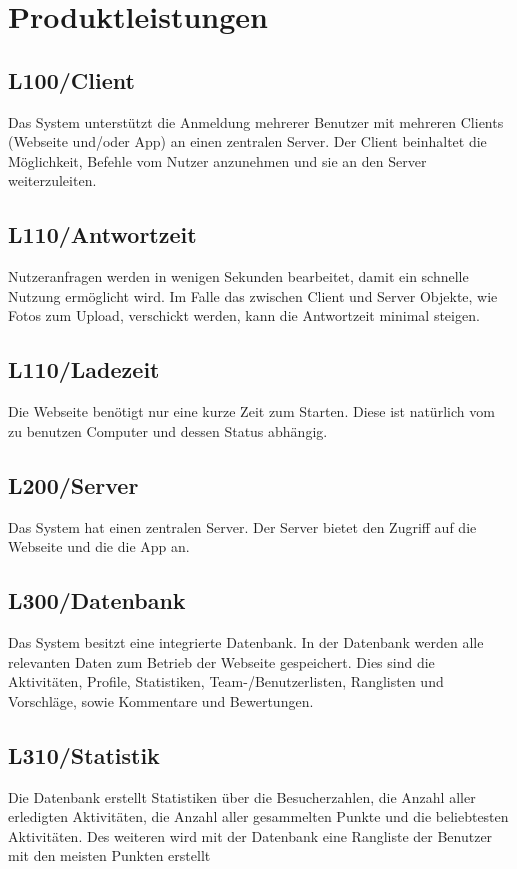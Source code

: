 \section{Produktleistungen}


\subsection{L100/Client} 
Das System unterstützt die Anmeldung mehrerer Benutzer mit mehreren Clients (Webseite und/oder App) an einen zentralen Server. Der Client beinhaltet die Möglichkeit, Befehle vom Nutzer anzunehmen und sie an den Server weiterzuleiten. 

\subsection{L110/Antwortzeit} 
Nutzeranfragen werden in wenigen Sekunden bearbeitet, damit ein schnelle Nutzung ermöglicht wird. Im Falle das zwischen Client und Server Objekte, wie Fotos zum Upload, verschickt werden, kann die Antwortzeit minimal steigen. 

\subsection{L110/Ladezeit} 
Die Webseite benötigt nur eine kurze Zeit zum Starten. Diese ist natürlich vom zu benutzen Computer und dessen Status abhängig. 

\subsection{L200/Server} 
Das System hat einen zentralen Server. Der Server bietet den Zugriff auf die Webseite und die die App an. 

\subsection{L300/Datenbank} 
Das System besitzt eine integrierte Datenbank. In der Datenbank werden alle relevanten Daten zum Betrieb der Webseite gespeichert. Dies sind die Aktivitäten, Profile, Statistiken, Team-/Benutzerlisten, Ranglisten und Vorschläge, sowie Kommentare und Bewertungen.

\subsection{L310/Statistik} 
Die Datenbank erstellt Statistiken über die Besucherzahlen, die Anzahl aller erledigten Aktivitäten, die Anzahl aller gesammelten Punkte und die beliebtesten Aktivitäten. Des weiteren wird mit der Datenbank eine Rangliste der Benutzer mit den meisten Punkten erstellt 


